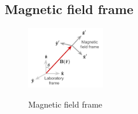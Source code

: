 \subsection{Magnetic field frame}
\label{sec:magnetic-field-frame}

\begin{figure}
    \centering
    \vspace{-10px}
    \caption{Magnetic field frame}
    \includegraphics[width=0.3\textwidth]{USPSC-img/polarization_basis.png}
    \label{fig:magnetic-field-frame}
    \vspace{-10px}
\end{figure}

